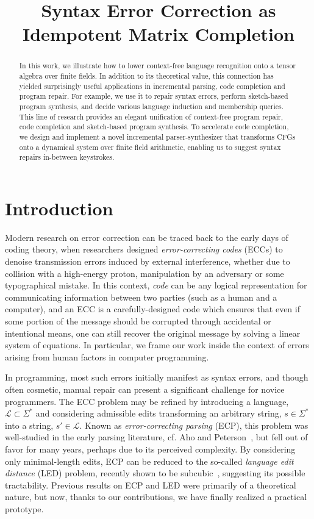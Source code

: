 \documentclass[sigplan,review,anonymous,acmsmall]{acmart}\settopmatter{printfolios=false,printccs=false,printacmref=false}
\begin{document}
\title{Syntax Error Correction as Idempotent Matrix Completion}
\begin{abstract}
In this work, we illustrate how to lower context-free language recognition onto a tensor algebra over finite fields. In addition to its theoretical value, this connection has yielded surprisingly useful applications in incremental parsing, code completion and program repair. For example, we use it to repair syntax errors, perform sketch-based program synthesis, and decide various language induction and membership queries. This line of research provides an elegant unification of context-free program repair, code completion and sketch-based program synthesis. To accelerate code completion, we design and implement a novel incremental parser-synthesizer that transforms CFGs onto a dynamical system over finite field arithmetic, enabling us to suggest syntax repairs in-between keystrokes.
\end{abstract}

\maketitle

\section{Introduction}

Modern research on error correction can be traced back to the early days of coding theory, when researchers designed \textit{error-correcting codes} (ECCs) to denoise transmission errors induced by external interference, whether due to collision with a high-energy proton, manipulation by an adversary or some typographical mistake. In this context, \textit{code} can be any logical representation for communicating information between two parties (such as a human and a computer), and an ECC is a carefully-designed code which ensures that even if some portion of the message should be corrupted through accidental or intentional means, one can still recover the original message by solving a linear system of equations. In particular, we frame our work inside the context of errors arising from human factors in computer programming.

In programming, most such errors initially manifest as syntax errors, and though often cosmetic, manual repair can present a significant challenge for novice programmers. The ECC problem may be refined by introducing a language, $\mathcal{L} \subset \Sigma^*$ and considering admissible edits transforming an arbitrary string, $s \in \Sigma^*$ into a string, $s'\in\mathcal{L}$. Known as \textit{error-correcting parsing} (ECP), this problem was well-studied in the early parsing literature, cf. Aho and Peterson~\cite{aho1972minimum}, but fell out of favor for many years, perhaps due to its perceived complexity. By considering only minimal-length edits, ECP can be reduced to the so-called \textit{language edit distance} (LED) problem, recently shown to be subcubic~\cite{bringmann2019truly}, suggesting its possible tractability. Previous results on ECP and LED were primarily of a theoretical nature, but now, thanks to our contributions, we have finally realized a practical prototype.
\end{document}
